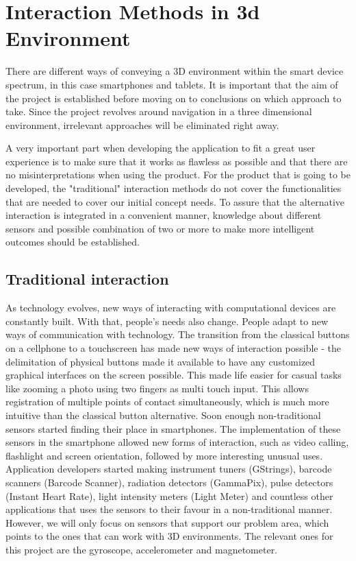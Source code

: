 \section{Interaction Methods in 3d Environment}
There are different ways of conveying a 3D environment within the smart device spectrum, in this case smartphones and tablets. It is important that the aim of the project is established before moving on to conclusions on which approach to take. Since the project revolves around navigation in a three dimensional environment, irrelevant approaches will be eliminated right away.

A very important part when developing the application to fit a great user experience is to make sure that it works as flawless as possible and that there are no misinterpretations when using the product. For the product that is going to be developed, the "traditional" interaction methods do not cover the functionalities that are needed to cover our initial concept needs. To assure that the alternative interaction is integrated in a convenient manner, knowledge about different sensors and possible combination of two or more to make more intelligent outcomes should be established.


\subsection{Traditional interaction}
As technology evolves, new ways of interacting with computational devices are constantly built. With that, people's needs also change. People adapt to new ways of communication with technology. \cite{Greenfield}
The transition from the classical buttons on a cellphone to a touchscreen has made new ways of interaction possible - the delimitation of physical buttons made it available to have any customized graphical interfaces on the screen possible. This made life easier for casual tasks like zooming a photo using two fingers as multi touch input. This allows registration of multiple points of contact simultaneously, which is much more intuitive than the classical button alternative.
Soon enough non-traditional sensors started finding their place in smartphones. The implementation of these sensors in the smartphone allowed new forms of interaction, such as video calling, flashlight and screen orientation, followed by more interesting unusual uses. Application developers started making instrument tuners (GStrings), barcode scanners (Barcode Scanner), radiation detectors (GammaPix), pulse detectors (Instant Heart Rate), light intensity meters (Light Meter) and countless other applications that uses the sensors to their favour in a non-traditional manner. However, we will only focus on sensors that support our problem area, which points to the ones that can work with 3D environments. The relevant ones for this project are the gyroscope, accelerometer and magnetometer.

